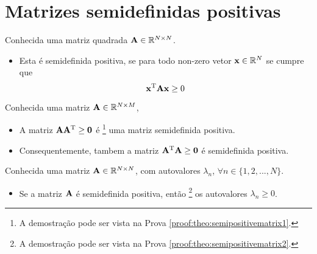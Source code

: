 \section{ Matrizes semidefinidas positivas}

\begin{definition}\label{def:semipositivematrix0}
Conhecida uma matriz quadrada $\MATRIX{A} \in \mathbb{R}^{N \times N}$. 
\begin{itemize}
\item Esta é semidefinida positiva, se para todo non-zero vetor $\VECTOR{x} \in \mathbb{R}^N$
se cumpre que \cite[pp. 159]{golub2013matrix} 
\begin{equation}
\VECTOR{x}^{\transpose} \MATRIX{A} \VECTOR{x} \geq 0
\end{equation}
\end{itemize}
\end{definition}

\begin{theorem}\label{theo:semipositivematrix1}
Conhecida uma matriz $\MATRIX{A} \in \mathbb{R}^{N \times M}$, 
\begin{itemize}
\item A matriz $\MATRIX{A}\MATRIX{A}^{\transpose} \geq \MATRIX{0}$ é
\footnote{A demostração pode ser vista na Prova \ref{proof:theo:semipositivematrix1}.} 
uma matriz semidefinida positiva.
\item Consequentemente, tambem a matriz $\MATRIX{A}^{\transpose}\MATRIX{A}  \geq \MATRIX{0}$ é semidefinida positiva.
\end{itemize}
\end{theorem}


\begin{theorem}\label{theo:semipositivematrix2}
Conhecida uma matriz $\MATRIX{A} \in \mathbb{R}^{N \times N}$, com  autovalores $\lambda_n$,
$\forall n \in \{1, 2, ..., N\}$.
\begin{itemize}
\item Se a matriz $\MATRIX{A}$ é semidefinida positiva, então
\footnote{A demostração pode ser vista na Prova \ref{proof:theo:semipositivematrix2}.} 
os autovalores $\lambda_n \geq 0$.
\end{itemize}
\end{theorem}
